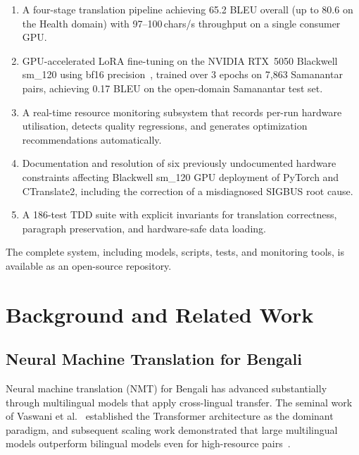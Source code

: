 \documentclass[conference]{IEEEtran}
\newcommand{\POSTFTBLEU}{0.17}
\begin{document}
\begin{enumerate}
  \item A four-stage translation pipeline achieving 65.2 BLEU overall (up to 80.6 on
        the Health domain) with 97--100\,chars/s throughput on a single consumer GPU.

  \item GPU-accelerated LoRA fine-tuning on the NVIDIA RTX~5050 Blackwell sm\_120
        using bf16 precision~\cite{micikevicius2018mixed}, trained over 3 epochs on
        7,863 Samanantar pairs, achieving \POSTFTBLEU{} BLEU on the open-domain
        Samanantar test set.

  \item A real-time resource monitoring subsystem that records per-run hardware
        utilisation, detects quality regressions, and generates optimization
        recommendations automatically.

  \item Documentation and resolution of six previously undocumented hardware
        constraints affecting Blackwell sm\_120 GPU deployment of PyTorch and
        CTranslate2, including the correction of a misdiagnosed SIGBUS root cause.

  \item A 186-test TDD suite with explicit invariants for translation correctness,
        paragraph preservation, and hardware-safe data loading.
\end{enumerate}

The complete system, including models, scripts, tests, and monitoring tools,
is available as an open-source repository.

\section{Background and Related Work}

\subsection{Neural Machine Translation for Bengali}

Neural machine translation (NMT) for Bengali has advanced substantially through
multilingual models that apply cross-lingual transfer.
The seminal work of Vaswani et al.~\cite{vaswani2017attention} established the
Transformer architecture as the dominant paradigm, and subsequent scaling work
demonstrated that large multilingual models outperform bilingual models even for
high-resource pairs~\cite{arivazhagan2019massively}.
\end{document}
